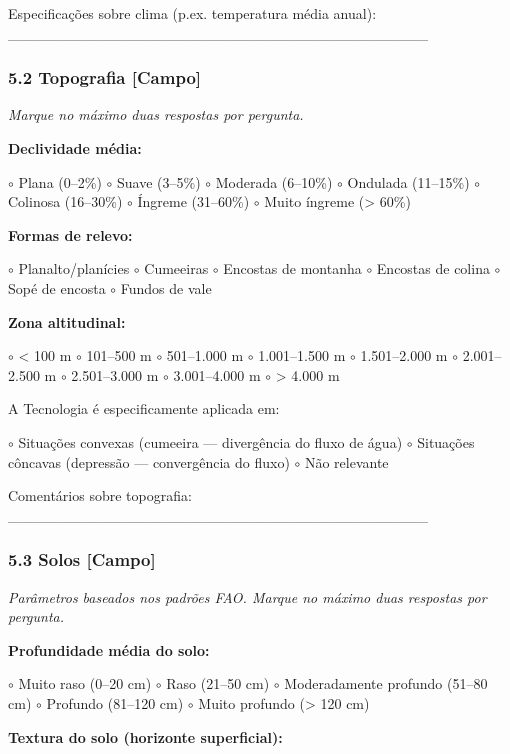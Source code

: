 Especificações sobre clima (p.ex. temperatura média anual): \_\_\_\_\_\_\_\_\_\_\_\_\_\_\_\_\_\_\_\_\_\_\_\_\_\_\_\_\_\_\_\_\_\_\_\_\_\_\_\_

\subsubsection{5.2 Topografia {[Campo]}}\label{topografia}

\emph{Marque no máximo duas respostas por pergunta.}

\textbf{Declividade média:}

$\circ$ Plana (0--2\%) $\circ$ Suave (3--5\%) $\circ$ Moderada (6--10\%) $\circ$ Ondulada (11--15\%) $\circ$ Colinosa (16--30\%) $\circ$ Íngreme (31--60\%) $\circ$ Muito íngreme (\textgreater{} 60\%)

\textbf{Formas de relevo:}

$\circ$ Planalto/planícies $\circ$ Cumeeiras $\circ$ Encostas de montanha $\circ$ Encostas de colina $\circ$ Sopé de encosta $\circ$ Fundos de vale

\textbf{Zona altitudinal:}

$\circ$ \textless{} 100 m $\circ$ 101--500 m $\circ$ 501--1.000 m $\circ$ 1.001--1.500 m $\circ$ 1.501--2.000 m $\circ$ 2.001--2.500 m $\circ$ 2.501--3.000 m $\circ$ 3.001--4.000 m $\circ$ \textgreater{} 4.000 m

A Tecnologia é especificamente aplicada em:

$\circ$ Situações convexas (cumeeira --- divergência do fluxo de água) $\circ$ Situações côncavas (depressão --- convergência do fluxo) $\circ$ Não relevante

Comentários sobre topografia: \_\_\_\_\_\_\_\_\_\_\_\_\_\_\_\_\_\_\_\_\_\_\_\_\_\_\_\_\_\_\_\_\_\_\_\_\_\_\_\_

\subsubsection{5.3 Solos {[Campo]}}\label{solos}

\emph{Parâmetros baseados nos padrões FAO. Marque no máximo duas respostas por pergunta.}

\textbf{Profundidade média do solo:}

$\circ$ Muito raso (0--20 cm) $\circ$ Raso (21--50 cm) $\circ$ Moderadamente profundo (51--80 cm) $\circ$ Profundo (81--120 cm) $\circ$ Muito profundo (\textgreater{} 120 cm)

\textbf{Textura do solo (horizonte superficial):}

